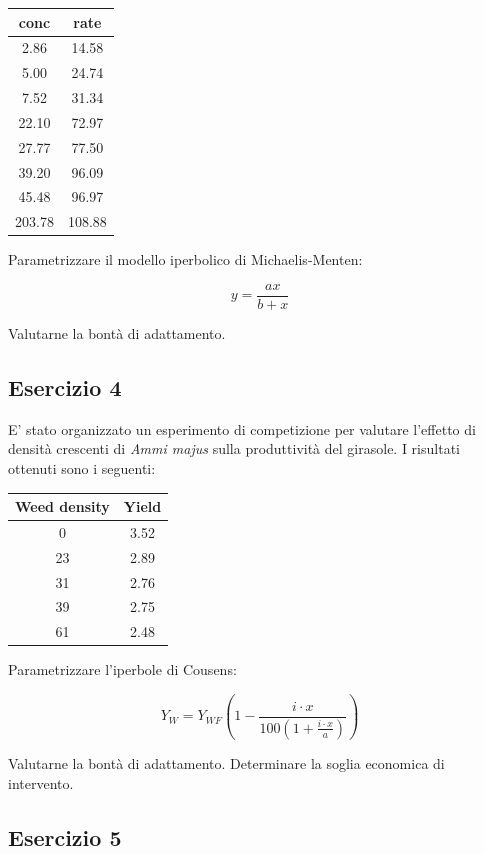 \documentclass[a4paper,12pt,oneside]{book}
\begin{document}
\begin{longtable}[]{@{}cc@{}}
\toprule
conc & rate \\
\midrule
\endhead
2.86 & 14.58 \\
5.00 & 24.74 \\
7.52 & 31.34 \\
22.10 & 72.97 \\
27.77 & 77.50 \\
39.20 & 96.09 \\
45.48 & 96.97 \\
203.78 & 108.88 \\
\bottomrule
\end{longtable}

Parametrizzare il modello iperbolico di Michaelis-Menten:

\[y = \frac{a x} {b + x}\]

Valutarne la bontà di adattamento.

\hypertarget{esercizio-4-5}{%
\subsection{Esercizio 4}\label{esercizio-4-5}}

E' stato organizzato un esperimento di competizione per valutare l'effetto di densità crescenti di \emph{Ammi majus} sulla produttività del girasole. I risultati ottenuti sono i seguenti:

\begin{longtable}[]{@{}cc@{}}
\toprule
Weed density & Yield \\
\midrule
\endhead
0 & 3.52 \\
23 & 2.89 \\
31 & 2.76 \\
39 & 2.75 \\
61 & 2.48 \\
\bottomrule
\end{longtable}

Parametrizzare l'iperbole di Cousens:

\[Y_W  = Y_{WF} \left( 1 - \frac{i \cdot x}{100\left( 1 + \frac{i \cdot x}{a} \right)} \right)\]

Valutarne la bontà di adattamento. Determinare la soglia economica di intervento.

\hypertarget{esercizio-5-4}{%
\subsection{Esercizio 5}\label{esercizio-5-4}}
\end{document}
